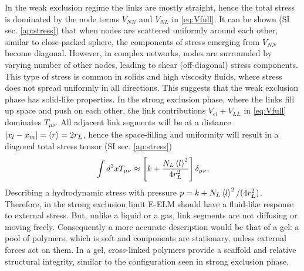 \documentclass[nofootinbib,preprint,floatfix,titlepage,endfloats]{revtex4} %
\begin{document}
In the weak exclusion regime the links are mostly straight, hence the total stress is dominated by the node terms $V_{NN}$ and $V_{NL}$ in \eqref{eq:Vfull}. 
It can be shown (SI sec. \ref{ap:stress}) that when nodes are scattered uniformly around each other, similar to close-packed sphere, the components of stress emerging from $V_{NN}$ become diagonal. 
However, in complex networks, nodes are surrounded by varying number of other nodes, leading to shear (off-diagonal) stress components. 
This type of stress is common in solids and high viscosity fluids, where stress does not spread uniformly in all directions. 
This suggests that the weak exclusion phase has solid-like properties. 
In the strong exclusion phase, where the links fill up space and push on each other,
the link contributions $V_{el}+V_{LL}$ in \eqref{eq:Vfull} dominates $T_{\mu\nu}$. 
All adjacent link segments will be at a distance $|x_l-x_m| = \left<r\right> = 2 r_L$, hence the space-filling and uniformity will result in a diagonal total stress tensor (SI sec. \ref{ap:stress}) %
\begin{equation}
    \mbox{}\int d^3x  T_{\mu\nu} \approx \left[ k + {N_L \left<l\right>^2\over 4r_L^2}   \right]\delta_{\mu\nu} \label{eq:Tstrong}
,\end{equation}
%
Describing a hydrodynamic stress with pressure $ p =  k + {N_L \left<l\right>^2/( 4r_L^2)}$. Therefore, in the strong exclusion limit E-ELM should have a fluid-like response to external stress. 
But, unlike a liquid or a gas, link segments are not diffusing or moving freely. Consequently a more accurate description would be that of a gel: a pool of polymers, which is soft and components are stationary, unless external forces act on them. 
In a gel, cross-linked polymers provide a scaffold and relative structural integrity, similar to the configuration seen in strong exclusion phase. 
\end{document}
